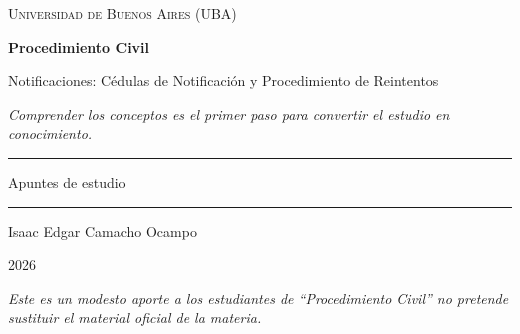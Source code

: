 \documentclass[12pt,oneside]{book}
\newcommand{\universidad}{Universidad de Buenos Aires (UBA)}
\newcommand{\materia}{Procedimiento Civil}
\newcommand{\titulo}{Notificaciones: Cédulas de Notificación y Procedimiento de Reintentos}
\newcommand{\autor}{Isaac Edgar Camacho Ocampo}
\newcommand{\anio}{2026}
\begin{document}

\begin{titlepage}

\thispagestyle{empty}

\begin{center}

\vspace*{1cm}

{\large \textsc{\universidad}}

\vspace{3cm}

{\Huge \textbf{\materia}}

\vspace{1cm}

{\LARGE \titulo}

\vspace{0.8cm}

\textit{Comprender los conceptos es el primer paso para convertir el estudio en conocimiento.}

\vspace{1.2cm}

\rule{0.70\textwidth}{0.5pt}

\vspace{0.5cm}

{\large Apuntes de estudio}

\vspace{0.5cm}

\rule{0.70\textwidth}{0.5pt}

\vfill

{\large \autor}

\vspace{0.3cm}

{\large \anio}

\end{center}

\vfill

\begin{flushleft}
\textit{Este es un modesto aporte a los estudiantes de ``Procedimiento Civil'' no pretende sustituir el material oficial de la materia.}
\end{flushleft}

\end{titlepage}

\tableofcontents
\clearpage

\end{document}
